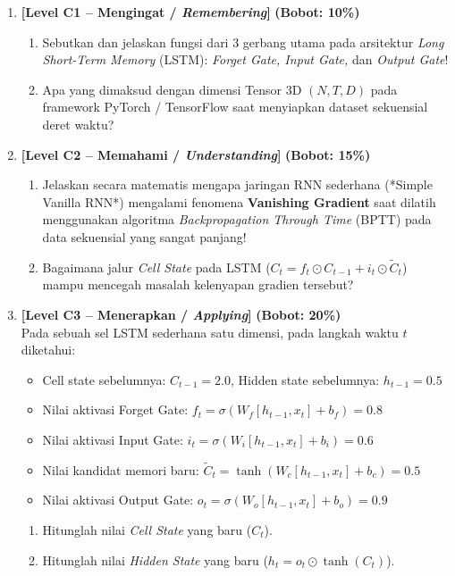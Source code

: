 \documentclass[11pt,a4paper]{article}
\begin{document}
\begin{enumerate}[leftmargin=1.5em, label=\textbf{Soal \arabic*.}]

    \item \textbf{[Level C1 -- Mengingat / \textit{Remembering}]} \hfill \textbf{(Bobot: 10\%)}
    \begin{enumerate}[label=\alph*.]
        \item Sebutkan dan jelaskan fungsi dari 3 gerbang utama pada arsitektur \textit{Long Short-Term Memory} (LSTM): \textit{Forget Gate, Input Gate,} dan \textit{Output Gate}!
        \item Apa yang dimaksud dengan dimensi Tensor 3D $(N, T, D)$ pada framework PyTorch / TensorFlow saat menyiapkan dataset sekuensial deret waktu?
    \end{enumerate}

    \vspace{0.3cm}

    \item \textbf{[Level C2 -- Memahami / \textit{Understanding}]} \hfill \textbf{(Bobot: 15\%)}
    \begin{enumerate}[label=\alph*.]
        \item Jelaskan secara matematis mengapa jaringan RNN sederhana (*Simple Vanilla RNN*) mengalami fenomena \textbf{Vanishing Gradient} saat dilatih menggunakan algoritma \textit{Backpropagation Through Time} (BPTT) pada data sekuensial yang sangat panjang!
        \item Bagaimana jalur \textit{Cell State} pada LSTM ($C_t = f_t \odot C_{t-1} + i_t \odot \tilde{C}_t$) mampu mencegah masalah kelenyapan gradien tersebut?
    \end{enumerate}

    \vspace{0.3cm}

    \item \textbf{[Level C3 -- Menerapkan / \textit{Applying}]} \hfill \textbf{(Bobot: 20\%)} \\
    Pada sebuah sel LSTM sederhana satu dimensi, pada langkah waktu $t$ diketahui:
    \begin{itemize}
        \item Cell state sebelumnya: $C_{t-1} = 2.0$, Hidden state sebelumnya: $h_{t-1} = 0.5$
        \item Nilai aktivasi Forget Gate: $f_t = \sigma(W_f [h_{t-1}, x_t] + b_f) = 0.8$
        \item Nilai aktivasi Input Gate: $i_t = \sigma(W_i [h_{t-1}, x_t] + b_i) = 0.6$
        \item Nilai kandidat memori baru: $\tilde{C}_t = \tanh(W_c [h_{t-1}, x_t] + b_c) = 0.5$
        \item Nilai aktivasi Output Gate: $o_t = \sigma(W_o [h_{t-1}, x_t] + b_o) = 0.9$
    \end{itemize}
    \begin{enumerate}[label=\alph*.]
        \item Hitunglah nilai \textit{Cell State} yang baru ($C_t$).
        \item Hitunglah nilai \textit{Hidden State} yang baru ($h_t = o_t \odot \tanh(C_t)$).
    \end{enumerate}


\end{enumerate}
\end{document}

